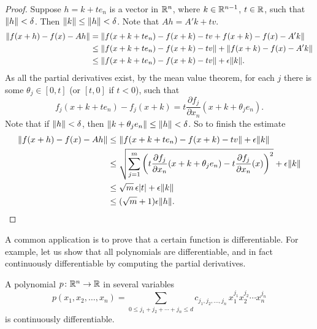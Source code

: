 \begin{proof}
Suppose $h = k + t e_n$ is a vector in ${\mathbb{R}}^n$, where $k \in {\mathbb{R}}^{n-1}$, $t
\in {\mathbb{R}}$, such that
$\lVert {h} \rVert < \delta$.  Then $\lVert {k} \rVert \leq \lVert {h} \rVert < \delta$.
Note that $Ah = A' k + tv$.
\begin{equation*}
\begin{split}
\lVert {f(x+h) - f(x) - Ah} \rVert
& = \lVert {f(x+k + t e_n) - f(x+k) - tv + f(x+k) - f(x) - A' k} \rVert
\\
& \leq \lVert {f(x+k + t e_n) - f(x+k) -tv} \rVert + \lVert {f(x+k) - f(x) -
A' k} \rVert
\\
& \leq \lVert {f(x+k + t e_n) - f(x+k) -tv} \rVert + \epsilon \lVert {k} \rVert .
\end{split}
\end{equation*}
As all the partial derivatives exist, by the mean value theorem,
for each $j$ there is some $\theta_j \in [0,t]$ (or $[t,0]$ if $t < 0$), such that
\begin{equation*}
f_j(x+k + t e_n) - f_j(x+k) =
t \frac{\partial f_j}{\partial x_n}(x+k+\theta_j e_n).
\end{equation*}
Note that if $\lVert {h} \rVert < \delta$, then $\lVert {k+\theta_j e_n} \rVert \leq \lVert {h} \rVert
< \delta$.
So to finish the estimate
\begin{equation*}
\begin{split}
\lVert {f(x+h) - f(x) - Ah} \rVert
& \leq \lVert {f(x+k + t e_n) - f(x+k) -tv} \rVert + \epsilon \lVert {k} \rVert
\\
& \leq \sqrt{\sum_{j=1}^m {\left(t\frac{\partial f_j}{\partial
x_n}(x+k+\theta_j e_n) -
t \frac{\partial f_j}{\partial x_n}(x)\right)}^2} + \epsilon \lVert {k} \rVert
\\
& \leq \sqrt{m}\, \epsilon \lvert {t} \rvert + \epsilon \lVert {k} \rVert
\\
& \leq (\sqrt{m}+1)\epsilon \lVert {h} \rVert . \qedhere
\end{split}
\end{equation*}
\end{proof}

A common application is to prove that a certain function is
differentiable.  For example, let us show that all polynomials
are differentiable, and in fact continuously differentiable
by computing the partial derivatives.

\begin{cor}
A polynomial $p \colon {\mathbb{R}}^n \to {\mathbb{R}}$ in several variables
\begin{equation*}
p(x_1,x_2,\ldots,x_n)
=
\sum_{0 \leq j_1+j_2+\cdots+j_n \leq d}
c_{j_1,j_2,\ldots,j_n}
\,
x_1^{j_1}
x_2^{j_2}
\cdots
x_n^{j_n}
\end{equation*}
is continuously differentiable.
\end{cor}

